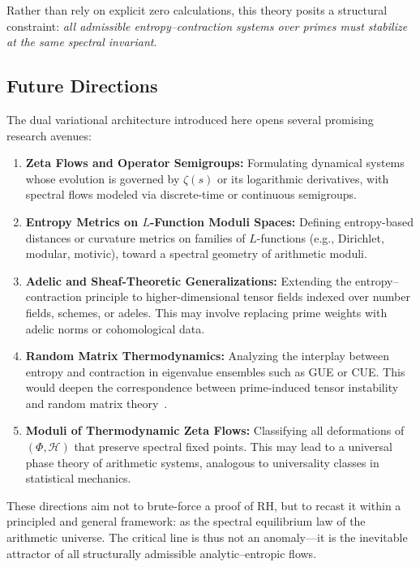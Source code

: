 \documentclass[12pt]{article}
\begin{document}
Rather than rely on explicit zero calculations, this theory posits a structural constraint: \emph{all admissible entropy–contraction systems over primes must stabilize at the same spectral invariant}.

\subsection*{Future Directions}

The dual variational architecture introduced here opens several promising research avenues:

\begin{enumerate}
    \item \textbf{Zeta Flows and Operator Semigroups:} Formulating dynamical systems whose evolution is governed by $\zeta(s)$ or its logarithmic derivatives, with spectral flows modeled via discrete-time or continuous semigroups.

    \item \textbf{Entropy Metrics on $L$-Function Moduli Spaces:} Defining entropy-based distances or curvature metrics on families of $L$-functions (e.g., Dirichlet, modular, motivic), toward a spectral geometry of arithmetic moduli.

    \item \textbf{Adelic and Sheaf-Theoretic Generalizations:} Extending the entropy–contraction principle to higher-dimensional tensor fields indexed over number fields, schemes, or adeles. This may involve replacing prime weights with adelic norms or cohomological data.

    \item \textbf{Random Matrix Thermodynamics:} Analyzing the interplay between entropy and contraction in eigenvalue ensembles such as GUE or CUE. This would deepen the correspondence between prime-induced tensor instability and random matrix theory~\cite{keating2000, mehta2004random}.

    \item \textbf{Moduli of Thermodynamic Zeta Flows:} Classifying all deformations of $(\Phi, \mathcal{H})$ that preserve spectral fixed points. This may lead to a universal phase theory of arithmetic systems, analogous to universality classes in statistical mechanics.
\end{enumerate}

\noindent These directions aim not to brute-force a proof of RH, but to recast it within a principled and general framework: as the spectral equilibrium law of the arithmetic universe. The critical line is thus not an anomaly—it is the inevitable attractor of all structurally admissible analytic–entropic flows.
\end{document}
